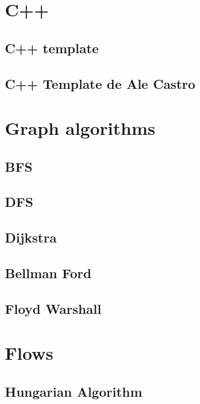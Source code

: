 \section{C++}
\subsection{C++ template}
\raggedbottom
\hrulefill
\subsection{C++ Template de Ale Castro}
\raggedbottom
\hrulefill

\section{Graph algorithms}
\subsection{BFS}
\raggedbottom
\hrulefill
\subsection{DFS}
\raggedbottom
\hrulefill
\subsection{Dijkstra}
\raggedbottom
\hrulefill
\subsection{Bellman Ford}
\raggedbottom
\hrulefill
\subsection{Floyd Warshall}
\raggedbottom
\hrulefill

\section{Flows}
\subsection{Hungarian Algorithm}
\raggedbottom
\hrulefill

